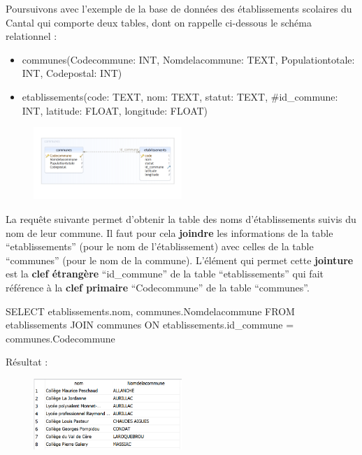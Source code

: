 \documentclass[
  a4paper,
  DIV=11,
  numbers=noendperiod]{scrartcl}
\newenvironment{Shaded}{\begin{snugshade}}{\end{snugshade}}
\newcommand{\KeywordTok}[1]{\textcolor[rgb]{0.00,0.23,0.31}{#1}}
\newcommand{\NormalTok}[1]{\textcolor[rgb]{0.00,0.23,0.31}{#1}}
\newcommand{\OperatorTok}[1]{\textcolor[rgb]{0.37,0.37,0.37}{#1}}
\providecommand{\tightlist}{%
  \setlength{\itemsep}{0pt}\setlength{\parskip}{0pt}}\usepackage{longtable,booktabs,array}
\begin{document}
Poursuivons avec l'exemple de la base de données des établissements
scolaires du Cantal qui comporte deux tables, dont on rappelle
ci-dessous le schéma relationnel :

\begin{itemize}
\tightlist
\item
  communes({Codecommune}: INT, Nomdelacommune: TEXT, Populationtotale:
  INT, Codepostal: INT)
\item
  etablissements({code}: TEXT, nom: TEXT, statut: TEXT, \#id\_commune:
  INT, latitude: FLOAT, longitude: FLOAT)
\end{itemize}

\begin{figure}

{\centering \includegraphics[width=0.5\textwidth,height=\textheight]{BDD11.png}

}

\end{figure}

La requête suivante permet d'obtenir la table des noms d'établissements
suivis du nom de leur commune. Il faut pour cela \textbf{joindre} les
informations de la table ``etablissements'' (pour le nom de
l'établissement) avec celles de la table ``communes'' (pour le nom de la
commune). L'élément qui permet cette \textbf{jointure} est la
\textbf{clef étrangère} ``id\_commune'' de la table ``etablissements''
qui fait référence à la \textbf{clef primaire} ``Codecommune'' de la
table ``communes''.

\begin{Shaded}
\begin{Highlighting}[]
\KeywordTok{SELECT}\NormalTok{ etablissements.nom, communes.Nomdelacommune }
\KeywordTok{FROM}\NormalTok{ etablissements }\KeywordTok{JOIN}\NormalTok{ communes }
\KeywordTok{ON}\NormalTok{ etablissements.id\_commune }\OperatorTok{=}\NormalTok{ communes.Codecommune}
\end{Highlighting}
\end{Shaded}

Résultat :

\begin{figure}

{\centering \includegraphics[width=0.5\textwidth,height=\textheight]{SQL9.png}

}

\end{figure}
\end{document}
